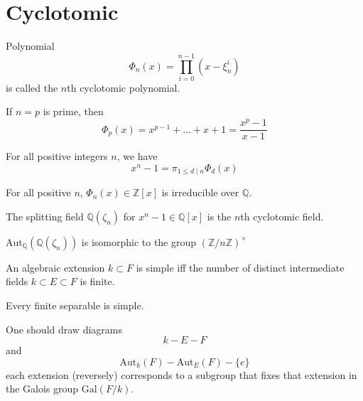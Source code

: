 \documentclass[openany]{book}
\newcommand{\Z}{\mathbb{Z}}
\newcommand{\Q}{\mathbb{Q}}
\newcommand{\gal}{\text{Gal}}
\begin{document}
\section{Cyclotomic}
\begin{defn}
    Polynomial 
    \begin{equation*}
        \Phi_n(x)=\prod_{i=0}^{n-1}(x-\xi_n^i)
    \end{equation*}
    is called the $n$th cyclotomic polynomial.
\end{defn}

\begin{prop}
    If $n=p$ is prime, then 
    \begin{equation*}
        \Phi_p(x)=x^{p-1}+\dots+x+1=\frac{x^p-1}{x-1}
    \end{equation*}

    For all positive integers $n$, we have 
    \begin{equation*}
        x^n-1=\pi_{1\leq d\mid n}\Phi_d(x)
    \end{equation*}
\end{prop}


\begin{prop}
    For all positive $n$, $\Phi_n(x)\in\Z[x]$ is irreducible over $\Q$.
\end{prop}

\begin{defn}
    The splitting field $\Q(\zeta_n)$  for $x^n-1\in\Q[x]$  is the $n$th cyclotomic field. 
\end{defn}

\begin{prop}
    $\text{Aut}_\Q(\Q(\zeta_n))$ is isomorphic to the group $(\Z/n\Z)^\times$
\end{prop}



\begin{prop}
    An algebraic extension $k\subset F$ is simple iff the number of distinct intermediate fields $k\subset E\subset F$ is finite.
\end{prop}

\begin{thm}
    Every finite separable is simple.
\end{thm}

One should draw diagrams 
\begin{equation*}
    k-E-F
\end{equation*}
and 
\begin{equation*}
    \text{Aut}_k(F)-\text{Aut}_E(F)-\{e\}
\end{equation*}
each extension (reversely) corresponds to a subgroup that fixes that extension in the Galois group $\gal(F/k)$.
\end{document}
